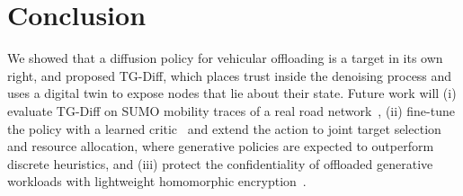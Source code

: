 \documentclass[journal]{IEEEtran}
\newcommand{\tgd}{TG-Diff}
\begin{document}
\section{Conclusion}\label{sec:conclusion}
We showed that a diffusion policy for vehicular offloading is a target in its own right, and proposed \tgd{}, which places trust inside the denoising process and uses a digital twin to expose nodes that lie about their state. \resConclusion{} Future work will (i) evaluate \tgd{} on SUMO mobility traces of a real road network~\cite{lopez2018sumo}, (ii) fine-tune the policy with a learned critic~\cite{wang2023diffusionql} and extend the action to joint target selection and resource allocation, where generative policies are expected to outperform discrete heuristics, and (iii) protect the confidentiality of offloaded generative workloads with lightweight homomorphic encryption~\cite{elbouabidi2026hybrid_he}.



\end{document}

